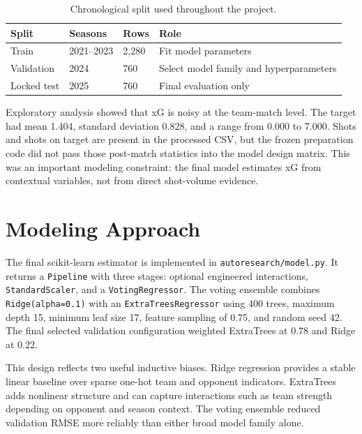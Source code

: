 \documentclass{article}
\begin{document}
\begin{table}[h]
\centering
\caption{Chronological split used throughout the project.}
\begin{tabular}{llll}
\toprule
Split & Seasons & Rows & Role \\
\midrule
Train & 2021--2023 & 2,280 & Fit model parameters \\
Validation & 2024 & 760 & Select model family and hyperparameters \\
Locked test & 2025 & 760 & Final evaluation only \\
\bottomrule
\end{tabular}
\end{table}

Exploratory analysis showed that xG is noisy at the team-match level. The target had mean 1.404, standard deviation 0.828, and a range from 0.000 to 7.000. Shots and shots on target are present in the processed CSV, but the frozen preparation code did not pass those post-match statistics into the model design matrix. This was an important modeling constraint: the final model estimates xG from contextual variables, not from direct shot-volume evidence.

\clearpage
\section{Modeling Approach}
The final scikit-learn estimator is implemented in \texttt{autoresearch/model.py}. It returns a \texttt{Pipeline} with three stages: optional engineered interactions, \texttt{StandardScaler}, and a \texttt{VotingRegressor}. The voting ensemble combines \texttt{Ridge(alpha=0.1)} with an \texttt{ExtraTreesRegressor} using 400 trees, maximum depth 15, minimum leaf size 17, feature sampling of 0.75, and random seed 42. The final selected validation configuration weighted ExtraTrees at 0.78 and Ridge at 0.22.

This design reflects two useful inductive biases. Ridge regression provides a stable linear baseline over sparse one-hot team and opponent indicators. ExtraTrees adds nonlinear structure and can capture interactions such as team strength depending on opponent and season context. The voting ensemble reduced validation RMSE more reliably than either broad model family alone.
\end{document}
